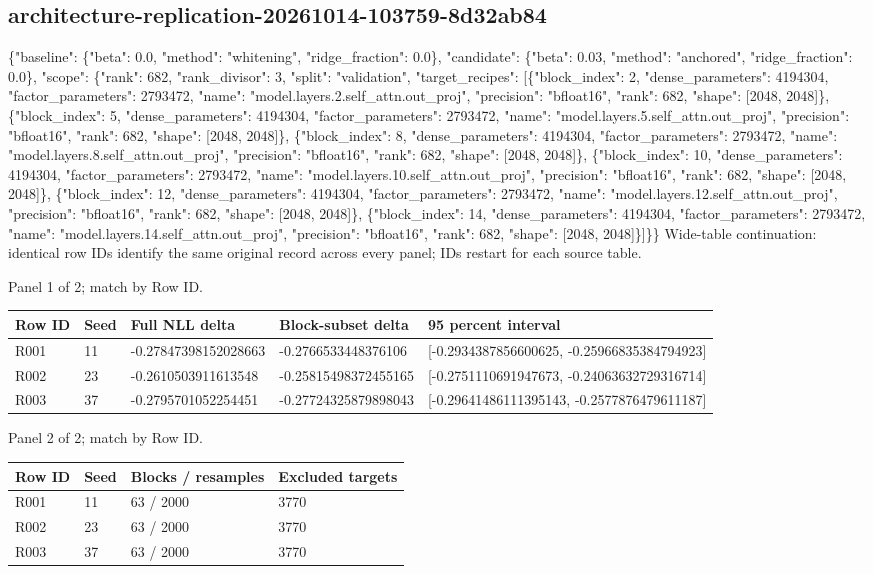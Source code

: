 \documentclass[10pt]{article}
\begin{document}
\subsection{architecture-replication-20261014-103759-8d32ab84}
\{"baseline": \{"beta": 0.0, "method": "whitening", "ridge\_fraction": 0.0\}, "candidate": \{"beta": 0.03, "method": "anchored", "ridge\_fraction": 0.0\}, "scope": \{"rank": 682, "rank\_divisor": 3, "split": "validation", "target\_recipes": [\{"block\_index": 2, "dense\_parameters": 4194304, "factor\_parameters": 2793472, "name": "model.layers.2.self\_attn.out\_proj", "precision": "bfloat16", "rank": 682, "shape": [2048, 2048]\}, \{"block\_index": 5, "dense\_parameters": 4194304, "factor\_parameters": 2793472, "name": "model.layers.5.self\_attn.out\_proj", "precision": "bfloat16", "rank": 682, "shape": [2048, 2048]\}, \{"block\_index": 8, "dense\_parameters": 4194304, "factor\_parameters": 2793472, "name": "model.layers.8.self\_attn.out\_proj", "precision": "bfloat16", "rank": 682, "shape": [2048, 2048]\}, \{"block\_index": 10, "dense\_parameters": 4194304, "factor\_parameters": 2793472, "name": "model.layers.10.self\_attn.out\_proj", "precision": "bfloat16", "rank": 682, "shape": [2048, 2048]\}, \{"block\_index": 12, "dense\_parameters": 4194304, "factor\_parameters": 2793472, "name": "model.layers.12.self\_attn.out\_proj", "precision": "bfloat16", "rank": 682, "shape": [2048, 2048]\}, \{"block\_index": 14, "dense\_parameters": 4194304, "factor\_parameters": 2793472, "name": "model.layers.14.self\_attn.out\_proj", "precision": "bfloat16", "rank": 682, "shape": [2048, 2048]\}]\}\}
Wide-table continuation: identical row IDs identify the same original record across every panel; IDs restart for each source table.
\par\noindent Panel 1 of 2; match by Row ID.
{\scriptsize\setlength{\tabcolsep}{2pt}
\begin{longtable}{p{}p{}p{}p{}p{}}
Row ID & Seed & Full NLL delta & Block-subset delta & 95 percent interval \\
\hline\endhead
R001 & 11 & -0.27847398152028663 & -0.2766533448376106 & [-0.2934387856600625, -0.25966835384794923] \\
R002 & 23 & -0.2610503911613548 & -0.25815498372455165 & [-0.2751110691947673, -0.24063632729316714] \\
R003 & 37 & -0.2795701052254451 & -0.27724325879898043 & [-0.29641486111395143, -0.2577876479611187] \\
\end{longtable}}
\par\noindent Panel 2 of 2; match by Row ID.
{\scriptsize\setlength{\tabcolsep}{2pt}
\begin{longtable}{p{}p{}p{}p{}}
Row ID & Seed & Blocks / resamples & Excluded targets \\
\hline\endhead
R001 & 11 & 63 / 2000 & 3770 \\
R002 & 23 & 63 / 2000 & 3770 \\
R003 & 37 & 63 / 2000 & 3770 \\
\end{longtable}}
\end{document}
